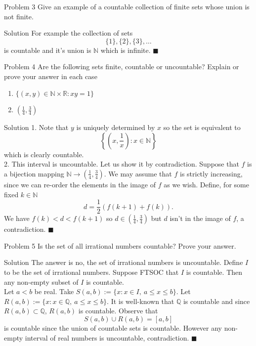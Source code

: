 \documentclass{article}
\begin{document}
\begin{problem}{Problem 3}
Give an example of a countable collection of finite sets whose union is
not finite.
\end{problem}

\begin{solution}{Solution}
For example the collection of sets
$$
\{ 1 \}, \{ 2 \}, \{ 3 \}, \ldots
$$
is countable and it's union is $\mathbb{N}$ which is infinite.
$\blacksquare$
\end{solution}
\newpage

\begin{problem}{Problem 4}
Are the following sets finite, countable or uncountable? Explain or
prove your answer in each case
\begin{enumerate}
\item $\{ (x,y) \in \mathbb{N} \times \mathbb{R} : xy = 1 \}$

\item $(\frac14, \frac34)$
\end{enumerate}
\end{problem}

\begin{solution}{Solution}
1. Note that $y$ is uniquely determined by $x$ so the set is equivalent to
$$
\left\{ \left(x, \frac{1}{x}\right) : x \in \mathbb{N} \right\}
$$
which is clearly countable. \\

2. This interval is uncountable. Let us show it by contradiction.
Suppose that $f$ is a bijection mapping
$\mathbb{N} \rightarrow (\frac14, \frac34)$. We may assume that
$f$ is strictly increasing, since we can re-order the elements in the
image of $f$ as we wish. Define, for some fixed $k \in \mathbb{N}$
$$
d = \frac12 \left( f(k+1) + f(k) \right).
$$
We have $f(k) < d < f(k+1)$ so $d \in (\frac14, \frac34)$ but $d$ isn't in
the image of $f$, a contradiction. $\blacksquare$
\end{solution}
\vspace{0.4cm}

\begin{problem}{Problem 5}
Is the set of all irrational numbers countable? Prove your answer.
\end{problem}

\begin{solution}{Solution}
The answer is no, the set of irrational numbers is uncountable. Define
$I$ to be the set of irrational numbers. Suppose
FTSOC that $I$ is countable. Then any non-empty subset of $I$ is countable.
\\

Let $a < b$ be real. Take $S(a,b) := \{ x : x \in I, \ a \leq x \leq b \}$.
Let $R(a,b) := \{ x : x \in \mathbb{Q}, \ a \leq x \leq b \}$. It is
well-known that $\mathbb{Q}$ is countable and since
$R(a,b) \subset \mathbb{Q}$, $R(a,b)$ is countable. Observe that
$$
S(a,b) \cup R(a,b) = [a,b]
$$
is countable since the union of countable sets is countable. However any
non-empty interval of real numbers is uncountable, contradiction.
$\blacksquare$
\end{solution}
\newpage
\end{document}

